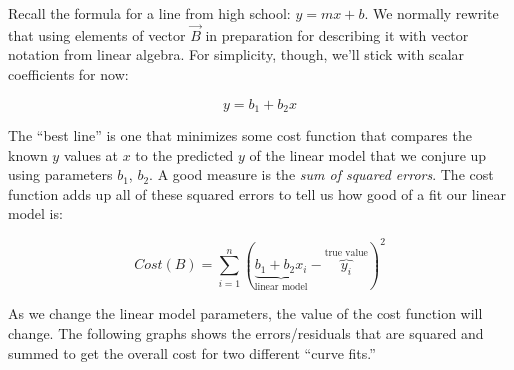 \begin{fullwidth}
Recall the formula for a line from high school: $y = m x + b$.  We normally rewrite that using elements of vector $\vec{B}$ in preparation for describing it with vector notation from linear algebra. For simplicity,  though, we'll stick with scalar coefficients for now:

\[
y = b_1 + b_2 x
\]

The ``best line'' is one that minimizes some cost function that compares the known $y$ values at $x$ to the predicted $y$ of the linear model that we conjure up using parameters $b_1$, $b_2$. A good measure is the {\em sum of squared errors}. The cost function adds up all of these squared errors to tell us how good of a fit our linear model is:

\[
Cost(B) = \sum_{i=1}^{n}(\underbrace{b_1 + b_2 x_i}_\text{linear model} - \overbrace{y_i}^\text{true value})^2
\]

\noindent As we change the linear model parameters, the value of the cost function will change.  The following graphs shows the errors/residuals that are squared and summed to get the overall cost for two different ``curve fits.''

\\


\end{fullwidth}
